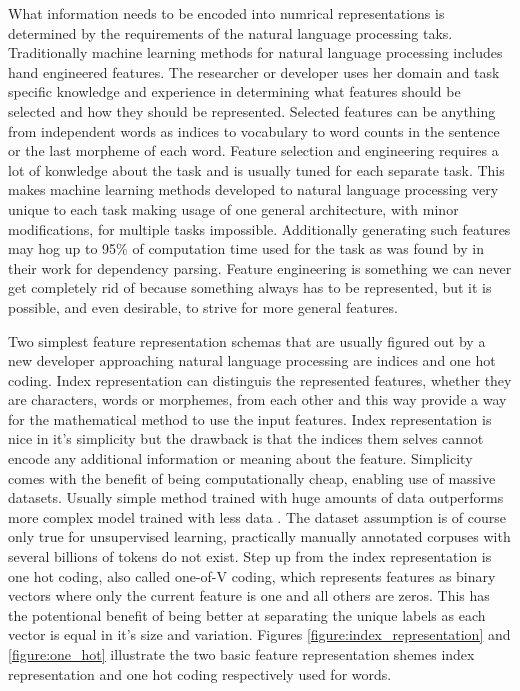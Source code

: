 \documentclass[12pt,a4paper,english
]{tutthesis}
\begin{document}
What information needs to be encoded into numrical representations is determined by the requirements of the natural language processing taks. Traditionally machine learning methods for natural language processing includes hand engineered features. The researcher or developer uses her domain and task specific knowledge and experience in determining what features should be selected and how they should be represented. Selected features can be anything from independent words as indices to vocabulary to word counts in the sentence or the last morpheme of each word. Feature selection and engineering requires a lot of konwledge about the task and is usually tuned for each separate task. This makes machine learning methods developed to natural language processing very unique to each task making usage of one general architecture, with minor modifications, for multiple tasks impossible. Additionally generating such features may hog up to 95\% of computation time used for the task as was found by \cite{Chen2014} in their work for dependency parsing. Feature engineering is something we can never get completely rid of because something always has to be represented, but it is possible, and even desirable, to strive for more general features.

Two simplest feature representation schemas that are usually figured out by a new developer approaching natural language processing are indices and one hot coding. Index representation can distinguis the represented features, whether they are characters, words or morphemes, from each other and this way provide a way for the mathematical method to use the input features. Index representation is nice in it's simplicity but the drawback is that the indices them selves cannot encode any additional information or meaning about the feature. Simplicity comes with the benefit of being computationally cheap, enabling use of massive datasets. Usually simple method trained with huge amounts of data outperforms more complex model trained with less data \cite{Mikolov2013}. The dataset assumption is of course only true for unsupervised learning, practically manually annotated corpuses with several billions of tokens do not exist. Step up from the index representation is one hot coding, also called one-of-V coding, which represents features as binary vectors where only the current feature is one and all others are zeros. This has the potentional benefit of being better at separating the unique labels as each vector is equal in it's size and variation. Figures \ref{figure:index_representation} and \ref{figure:one_hot} illustrate the two basic feature representation shemes index representation and one hot coding respectively used for words.
\end{document}
